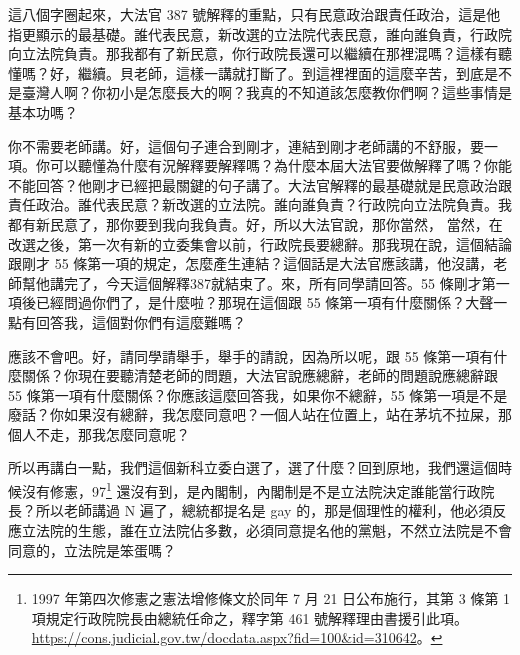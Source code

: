 \hypertarget{c08:cue:17}{}這八個字圈起來，大法官 387 號解釋的重點，只有民意政治跟責任政治，這是他指更顯示的最基礎。誰代表民意，新改選的立法院代表民意，誰向誰負責，行政院向立法院負責。那我都有了新民意，你行政院長還可以繼續在那裡混嗎？這樣有聽懂嗎？好，繼續。貝老師，這樣一講就打斷了。到這裡裡面的這麼辛苦，到底是不是臺灣人啊？你初小是怎麼長大的啊？我真的不知道該怎麼教你們啊？這些事情是基本功嗎？

\hypertarget{c08:cue:18}{}你不需要老師講。好，這個句子連合到剛才，連結到剛才老師講的不舒服，要一項。你可以聽懂為什麼有況解釋要解釋嗎？為什麼本屆大法官要做解釋了嗎？你能不能回答？他剛才已經把最關鍵的句子講了。大法官解釋的最基礎就是民意政治跟責任政治。誰代表民意？新改選的立法院。誰向誰負責？行政院向立法院負責。我都有新民意了，那你要到我向我負責。好，所以大法官說，那你當然，
\hypertarget{c08:cue:19}{}當然，在改選之後，第一次有新的立委集會以前，行政院長要總辭。那我現在說，這個結論跟剛才 55 條第一項的規定，怎麼產生連結？這個話是大法官應該講，他沒講，老師幫他講完了，今天這個解釋387就結束了。來，所有同學請回答。55 條剛才第一項後已經問過你們了，是什麼啦？那現在這個跟 55 條第一項有什麼關係？大聲一點有回答我，這個對你們有這麼難嗎？

\hypertarget{c08:cue:20}{}應該不會吧。好，請同學請舉手，舉手的請說，因為所以呢，跟 55 條第一項有什麼關係？你現在要聽清楚老師的問題，大法官說應總辭，老師的問題說應總辭跟 55 條第一項有什麼關係？你應該這麼回答我，如果你不總辭，55 條第一項是不是廢話？你如果沒有總辭，我怎麼同意吧？一個人站在位置上，站在茅坑不拉屎，那個人不走，那我怎麼同意呢？

\hypertarget{c08:cue:21}{}所以再講白一點，我們這個新科立委白選了，選了什麼？回到原地，我們還這個時候沒有修憲，97\footnote{1997 年第四次修憲之憲法增修條文於同年 7 月 21 日公布施行，其第 3 條第 1 項規定行政院院長由總統任命之，釋字第 461 號解釋理由書援引此項。\url{https://cons.judicial.gov.tw/docdata.aspx?fid=100&id=310642}。} 還沒有到，是內閣制，內閣制是不是立法院決定誰能當行政院長？所以老師講過 N 遍了，總統都提名是 gay 的，那是個理性的權利，他必須反應立法院的生態，誰在立法院佔多數，必須同意提名他的黨魁，不然立法院是不會同意的，立法院是笨蛋嗎？

